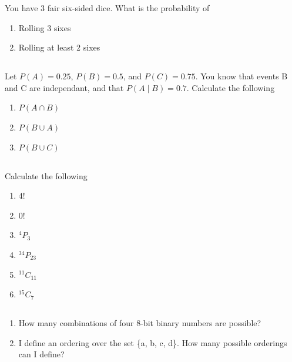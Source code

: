 \documentclass[twocolumn]{article}
\begin{document}
    You have 3 fair six-sided dice. What is the probability of

    \begin{enumerate}
        \item Rolling 3 sixes
        \item Rolling at least 2 sixes
    \end{enumerate}

\subsection{}

    Let $P(A) = 0.25$, $P(B) = 0.5$, and $P(C) = 0.75$. You know that events B and C are independant, and that $P(A \mid B ) = 0.7 $. Calculate the following

    \begin{enumerate}
        \item $P(A \cap B)$
        \item $P(B \cup A)$
        \item $P(B \cup C)$
    \end{enumerate}

\subsection{}

    Calculate the following

    \begin{multicols}{2}
        \begin{enumerate}
            \item $ 4! $
            \item $ 0! $
            \item $ ^4P_3 $
            \item $ ^{34}P_{23} $
            \item $ ^{11}C_{11} $
            \item $ ^{15}C_{7} $
        \end{enumerate}
    \end{multicols}

\subsection{}

    \begin{enumerate}
        \item How many combinations of four 8-bit binary numbers are possible?
        \item I define an ordering over the set \{a, b, c, d\}. How many possible orderings can I define?
    \end{enumerate}
\end{document}
